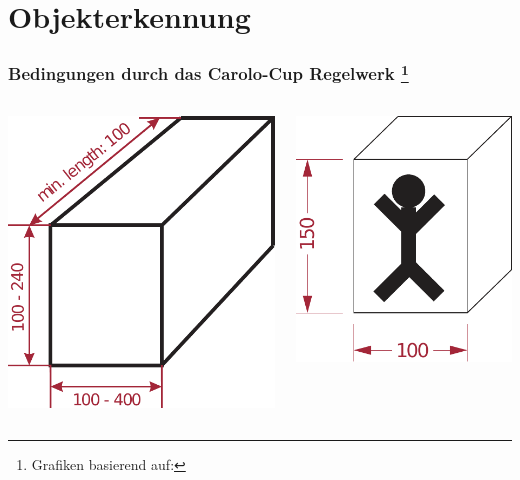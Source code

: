 \section{Objekterkennung}
\begin{frame}
    \frametitle{Bedingungen durch das Carolo-Cup Regelwerk
    \footnote{Grafiken basierend auf: }}
    \begin{columns}
        \begin{column}{.33\textwidth}
            \includegraphics[height=.45\textheight]{../Material/Presentation/Obstacle.pdf}
        \end{column}
        \pause
        \begin{column}{.33\textwidth}
            \includegraphics[height=.45\textheight]{../Material/Presentation/Pedestrian.pdf}

\end{column}
\end{columns}
\end{frame}
